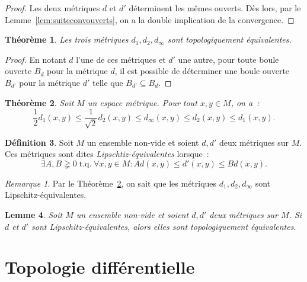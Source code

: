 \documentclass{report}
\newtheorem{thm}{Théorème}[section]
\newtheorem{lem}[thm]{Lemme}
\theoremstyle{definition}
\newtheorem{déf}[thm]{Définition}
\theoremstyle{remark}
\newtheorem*{rmq}{Remarque}
\DeclareMathOperator{\tq}{\text{ t.q. }}
\begin{document}
		\begin{proof} Les deux métriques $d$ et $d'$ déterminent les mêmes ouverts. Dès lors, par le Lemme~\ref{lem:suiteconvouverts}, on a la double implication
		de la convergence.
		\end{proof}
		
		\begin{thm} Les trois métriques $d_1, d_2, d_\infty$ sont topologiquement équivalentes.
		\end{thm}
		
		\begin{proof} En notant $d$ l'une de ces métriques et $d'$ une autre, pour toute boule ouverte $B_d$ pour la métrique $d$, il est possible de déterminer une
		boule ouverte $B_{d'}$ pour la métrique $d'$ telle que $B_{d'} \subseteq B_d$.
		\end{proof}
		
		\begin{thm}\label{thm:d1d2dinflipschitzeq} Soit $M$ un espace métrique. Pour tout $x, y \in M$, on a~:
		\[\frac 12 d_1(x, y) \leq \frac 1{\sqrt 2}d_2(x, y) \leq d_\infty(x, y) \leq d_2(x, y) \leq d_1(x, y).\]
		\end{thm}
		
		\begin{déf} Soit $M$ un ensemble non-vide et soient $d, d'$ deux métriques sur $M$. Ces métriques sont dites \textit{Lipschtiz-équivalentes} lorsque~:
		\[\exists A, B \gneqq 0 \tq \forall x, y \in M : Ad(x, y) \leq d'(x, y) \leq Bd(x, y).\]
		\end{déf}
		
		\begin{rmq} Par le Théorème~\ref{thm:d1d2dinflipschitzeq}, on sait que les métriques $d_1, d_2, d_\infty$ sont Lipschitz-équivalentes.
		\end{rmq}
		
		\begin{lem} Soit $M$ un ensemble non-vide et soient $d, d'$ deux métriques sur $M$. Si $d$ et $d'$ sont Lipschitz-équivalentes, alors elles sont topologiquement
		équivalentes.
		\end{lem}

\chapter{Topologie différentielle}
\end{document}
